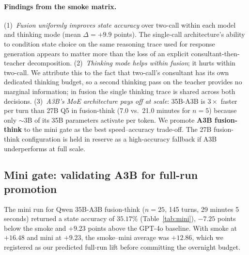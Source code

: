 \documentclass[11pt]{article}
\begin{document}
\paragraph{Findings from the smoke matrix.}
(1)~\emph{Fusion uniformly improves state accuracy} over two-call within each model and thinking mode (mean $\Delta{=}+9.9$ points). The single-call architecture's ability to condition state choice on the same reasoning trace used for response generation appears to matter more than the loss of an explicit consultant-then-teacher decomposition. (2)~\emph{Thinking mode helps within fusion}; it hurts within two-call. We attribute this to the fact that two-call's consultant has its own dedicated thinking budget, so a second thinking pass on the teacher provides no marginal information; in fusion the single thinking trace is shared across both decisions. (3)~\emph{A3B's MoE architecture pays off at scale}: 35B-A3B is $3\times$ faster per turn than 27B Q5 in fusion-think (7.0 vs.\ 21.0 minutes for $n{=}5$) because only $\sim$3B of its 35B parameters activate per token. We promote \textbf{A3B fusion-think} to the mini gate as the best speed--accuracy trade-off. The 27B fusion-think configuration is held in reserve as a high-accuracy fallback if A3B underperforms at full scale.

\subsection{Mini gate: validating A3B for full-run promotion}
\label{sec:mini}

The mini run for Qwen 35B-A3B fusion-think ($n{=}25$, 145 turns, 29 minutes 5 seconds) returned a state accuracy of $35.17\%$ (Table~\ref{tab:mini}), $-7.25$ points below the smoke and $+9.23$ points above the GPT-4o baseline. With smoke at $+16.48$ and mini at $+9.23$, the smoke--mini average was $+12.86$, which we registered as our predicted full-run lift before committing the overnight budget.
\end{document}
